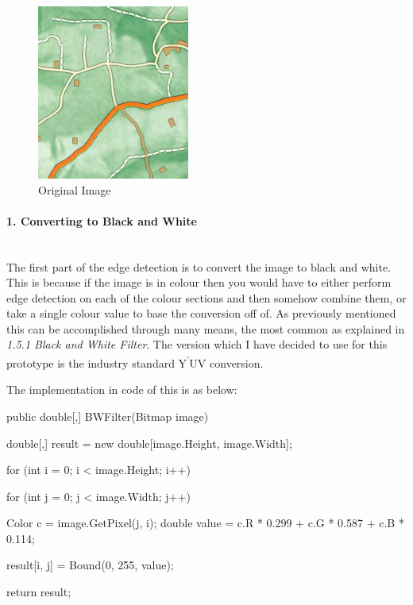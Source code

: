 \begin{FlushLeft}
        \begin{figure}[H]
            \centering
            \includegraphics[width=5cm]{images/edgeDetectionPrototype/in.jpg}
            \caption{Original Image}
            \label{fig:proto_original}
        \end{figure}
        
        \paragraph{1. Converting to Black and White} \mbox{} \\
        The first part of the edge detection is to convert the image to black and white. This is because if the image is in colour then you would have to either perform edge detection on each of the colour sections and then somehow combine them, or take a single colour value to base the conversion off of. As previously mentioned this can be accomplished through many means, the most common as explained in \textit{1.5.1 Black and White Filter}. The version which I have decided to use for this prototype is the industry standard Y\textsuperscript{'}UV conversion. \\ \bk
        
        The implementation in code of this is as below:
        \begin{cscode}
public double[,] BWFilter(Bitmap image)
{
    double[,] result = new double[image.Height, image.Width];

    for (int i = 0; i < image.Height; i++)
    {
        for (int j = 0; j < image.Width; j++)
        {
            Color c = image.GetPixel(j, i);
            double value = c.R * 0.299 + c.G * 0.587 + c.B * 0.114;

            result[i, j] = Bound(0, 255, value);
        }
    }

    return result;
}
        \end{cscode}
        

\end{FlushLeft}
